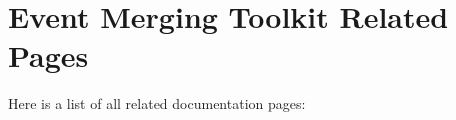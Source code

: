 \section{Event Merging Toolkit Related Pages}
Here is a list of all related documentation pages:\begin{CompactList}
\item {}

\end{CompactList}

